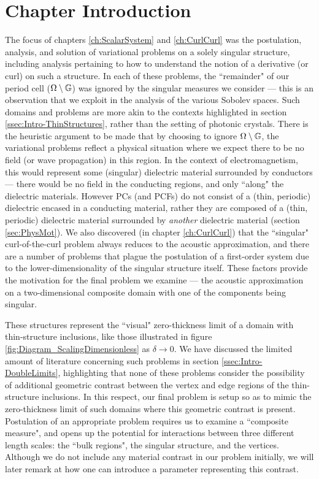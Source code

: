 \section{Chapter Introduction} \label{sec:SingIncChapterIntro}
The focus of chapters \ref{ch:ScalarSystem} and \ref{ch:CurlCurl} was the postulation, analysis, and solution of variational problems on a solely singular structure, including analysis pertaining to how to understand the notion of a derivative (or curl) on such a structure.
In each of these problems, the ``remainder" of our period cell ($\Omega\setminus\mathbb{G}$) was ignored by the singular measures we consider --- this is an observation that we exploit in the analysis of the various Sobolev spaces.
Such domains and problems are more akin to the contexts highlighted in section \ref{ssec:Intro-ThinStructures}, rather than the setting of photonic crystals.
There is the heuristic argument to be made that by choosing to ignore $\Omega\setminus\mathbb{G}$, the variational problems reflect a physical situation where we expect there to be no field (or wave propagation) in this region.
In the context of electromagnetism, this would represent some (singular) dielectric material surrounded by conductors --- there would be no field in the conducting regions, and only ``along" the dielectric materials.
However PCs (and PCFs) do not consist of a (thin, periodic) dielectric encased in a conducting material, rather they are composed of a (thin, periodic) dielectric material surrounded by \emph{another} dielectric material (section \ref{sec:PhysMot}).
We also discovered (in chapter \ref{ch:CurlCurl}) that the ``singular" curl-of-the-curl problem always reduces to the acoustic approximation, and there are a number of problems that plague the postulation of a first-order system due to the lower-dimensionality of the singular structure itself.
These factors provide the motivation for the final problem we examine --- the acoustic approximation on a two-dimensional composite domain with one of the components being singular.

These structures represent the ``visual" zero-thickness limit of a domain with thin-structure inclusions, like those illustrated in figure \ref{fig:Diagram_ScalingDimensionless} as $\delta\rightarrow0$.
We have discussed the limited amount of literature concerning such problems in section \ref{ssec:Intro-DoubleLimits}, highlighting that none of these problems consider the possibility of additional geometric contrast between the vertex and edge regions of the thin-structure inclusions.
In this respect, our final problem is setup so as to mimic the zero-thickness limit of such domains where this geometric contrast is present.
Postulation of an appropriate problem requires us to examine a ``composite measure", and opens up the potential for interactions between three different length scales: the ``bulk regions", the singular structure, and the vertices.
Although we do not include any material contrast in our problem initially, we will later remark at how one can introduce a parameter representing this contrast.

